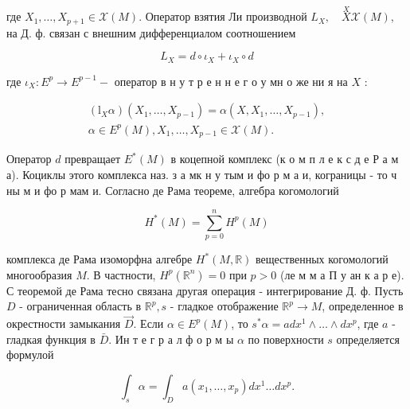 \documentclass[10pt]{article}
\begin{document}
где $X_{1}, \ldots, X_{p+1} \in \mathscr{X}(M)$. Оператор взятия $Л и$ производной $L_{X}, \quad \stackrel{X}{X} \mathscr{X}(M)$, на Д. ф. связан с внешним дифференциалом соотношением



\[

L_{X}=d \circ \iota_{X}+\iota_{X} \circ d

\]



где $\iota_{X}: E^{p} \rightarrow E^{p-1}-$ оператор в н у т р е н н е г о у мн о же ни я на $X$ :



\[

\begin{gathered}

\left(\mathrm{l}_{X} \alpha\right)\left(X_{1}, \ldots, X_{p-1}\right)=\alpha\left(X, X_{1}, \ldots, X_{p-1}\right), \\

\alpha \in E^{p}(M), X_{1}, \ldots, X_{p-1} \in \mathscr{X}(M) .

\end{gathered}

\]



Оператор $d$ превращает $E^{*}(M)$ в коцепной комплекс (к о м п л е к с д е Р а м а). Коциклы этого комплекса наз. з а мк н у тым и фо р м а и, кограницы - то ч ны м и фо р мам и. Согласно де Рама теореме, алгебра когомологий



\[

H^{*}(M)=\sum_{p=0}^{n} H^{p}(M)

\]



комплекса де Рама изоморфна алгебре $H^{*}(M, \mathbb{R})$ вещественных когомологий многообразия $M$. В частности, $H^{p}\left(\mathbb{R}^{n}\right)=0$ при $p>0$ (ле м м а П у ан к а р е). С теоремой де Рама тесно связана другая операция - интегрирование Д. ф. Пусть $D$ - ограниченная область в $\mathbb{R}^{p}, s$ - гладкое отображение $\mathbb{R}^{p} \rightarrow M$, определенное в окрестности замыкания $\vec{D}$. Если $\alpha \in E^{p}(M)$, то $s^{*} \alpha=a d x^{1} \wedge \ldots \wedge d x^{p}$, где $a$ - гладкая функция в $\bar{D}$. Ин т е г р а л ф о р м ы $\alpha$ по поверхности $s$ определяется формулой



\[

\int_{s} \alpha=\int_{D} a\left(x_{1}, \ldots, x_{p}\right) d x^{1} \ldots d x^{p} .

\]
\end{document}
